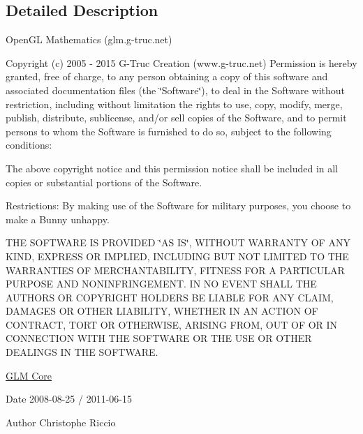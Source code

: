 \subsection{Detailed Description}
Open\-G\-L Mathematics (glm.\-g-\/truc.\-net)

Copyright (c) 2005 -\/ 2015 G-\/\-Truc Creation (www.\-g-\/truc.\-net) Permission is hereby granted, free of charge, to any person obtaining a copy of this software and associated documentation files (the \char`\"{}\-Software\char`\"{}), to deal in the Software without restriction, including without limitation the rights to use, copy, modify, merge, publish, distribute, sublicense, and/or sell copies of the Software, and to permit persons to whom the Software is furnished to do so, subject to the following conditions\-:

The above copyright notice and this permission notice shall be included in all copies or substantial portions of the Software.

Restrictions\-: By making use of the Software for military purposes, you choose to make a Bunny unhappy.

T\-H\-E S\-O\-F\-T\-W\-A\-R\-E I\-S P\-R\-O\-V\-I\-D\-E\-D \char`\"{}\-A\-S I\-S\char`\"{}, W\-I\-T\-H\-O\-U\-T W\-A\-R\-R\-A\-N\-T\-Y O\-F A\-N\-Y K\-I\-N\-D, E\-X\-P\-R\-E\-S\-S O\-R I\-M\-P\-L\-I\-E\-D, I\-N\-C\-L\-U\-D\-I\-N\-G B\-U\-T N\-O\-T L\-I\-M\-I\-T\-E\-D T\-O T\-H\-E W\-A\-R\-R\-A\-N\-T\-I\-E\-S O\-F M\-E\-R\-C\-H\-A\-N\-T\-A\-B\-I\-L\-I\-T\-Y, F\-I\-T\-N\-E\-S\-S F\-O\-R A P\-A\-R\-T\-I\-C\-U\-L\-A\-R P\-U\-R\-P\-O\-S\-E A\-N\-D N\-O\-N\-I\-N\-F\-R\-I\-N\-G\-E\-M\-E\-N\-T. I\-N N\-O E\-V\-E\-N\-T S\-H\-A\-L\-L T\-H\-E A\-U\-T\-H\-O\-R\-S O\-R C\-O\-P\-Y\-R\-I\-G\-H\-T H\-O\-L\-D\-E\-R\-S B\-E L\-I\-A\-B\-L\-E F\-O\-R A\-N\-Y C\-L\-A\-I\-M, D\-A\-M\-A\-G\-E\-S O\-R O\-T\-H\-E\-R L\-I\-A\-B\-I\-L\-I\-T\-Y, W\-H\-E\-T\-H\-E\-R I\-N A\-N A\-C\-T\-I\-O\-N O\-F C\-O\-N\-T\-R\-A\-C\-T, T\-O\-R\-T O\-R O\-T\-H\-E\-R\-W\-I\-S\-E, A\-R\-I\-S\-I\-N\-G F\-R\-O\-M, O\-U\-T O\-F O\-R I\-N C\-O\-N\-N\-E\-C\-T\-I\-O\-N W\-I\-T\-H T\-H\-E S\-O\-F\-T\-W\-A\-R\-E O\-R T\-H\-E U\-S\-E O\-R O\-T\-H\-E\-R D\-E\-A\-L\-I\-N\-G\-S I\-N T\-H\-E S\-O\-F\-T\-W\-A\-R\-E.

\hyperlink{group__core}{G\-L\-M Core}

\begin{DoxyDate}{Date}
2008-\/08-\/25 / 2011-\/06-\/15 
\end{DoxyDate}
\begin{DoxyAuthor}{Author}
Christophe Riccio 
\end{DoxyAuthor}
